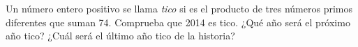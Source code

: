 Un número entero positivo se llama \textit{tico} si es el producto de tres números primos diferentes que suman 74. Comprueba que 2014 es tico. ¿Qué año será el próximo año tico? ¿Cuál será el último año tico de la historia?
